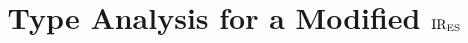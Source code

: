 \documentclass[10pt,conference]{IEEEtran}
\begin{document}
\title{Type Analysis for a Modified ${\text{IR}_\text{ES}}$}

\author{}
% 
% 

\maketitle





\end{document}
